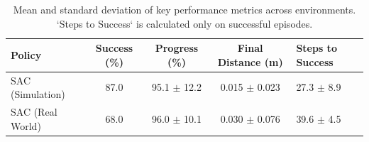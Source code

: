 
\begin{table}[!htbp]
\caption{Mean and standard deviation of key performance metrics across environments. `Steps to Success` is calculated only on successful episodes.}
\label{tab:performance_summary}
\begin{tabular}{l c c c}
\toprule
\textbf{Policy} & \textbf{Success (\%)} & \textbf{Progress (\%)} & \textbf{Final Distance (m)} & \textbf{Steps to Success} \\
\midrule
SAC (Simulation) & 87.0 & 95.1 $\pm$ 12.2 & 0.015 $\pm$ 0.023 & 27.3 $\pm$ 8.9 \\
SAC (Real World) & 68.0 & 96.0 $\pm$ 10.1 & 0.030 $\pm$ 0.076 & 39.6 $\pm$ 4.5 \\
\bottomrule
\end{tabular}
\end{table}